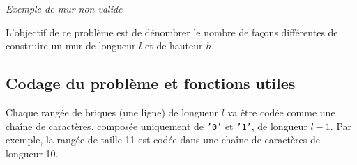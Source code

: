 \begin{center}

\textit{Exemple de mur non valide}
\end{center}

L'objectif de ce problème est de dénombrer le nombre de façons différentes de construire un mur de
longueur $l$ et de hauteur $h$.







\subsection*{Codage du problème et fonctions utiles}
\label{sec:codageFonctions}

Chaque rangée de briques (une ligne) de longueur $l$ va être codée comme une chaîne de caractères, composée uniquement de \texttt{'0'} et \texttt{'1'}, de longueur $l-1$. Par exemple, la rangée de taille 11 %
est codée dans une chaîne de caractères de longueur 10.%





